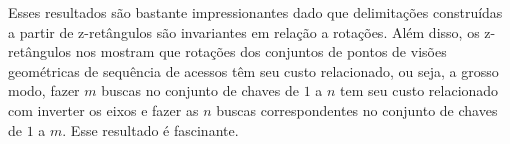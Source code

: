 Esses resultados são bastante impressionantes dado que delimitações construídas a partir de z-retângulos são invariantes em relação a rotações. Além disso, os z-retângulos nos mostram que rotações dos conjuntos de pontos de visões geométricas de sequência de acessos têm seu custo relacionado, ou seja, a grosso modo, fazer $m$ buscas no conjunto de chaves de $1$ a $n$ tem seu custo relacionado com inverter os eixos e fazer as $n$ buscas correspondentes no conjunto de chaves de $1$ a $m$. Esse resultado é fascinante. 
